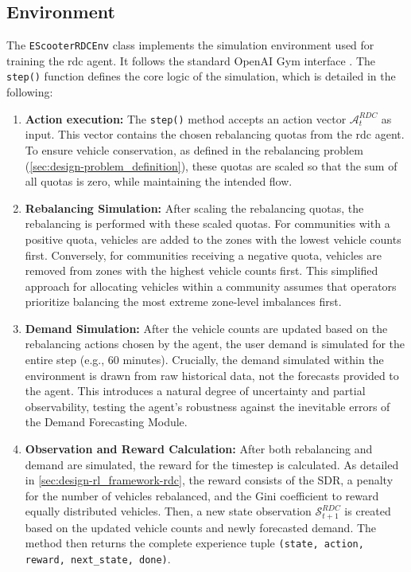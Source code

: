\subsection{Environment}
The \texttt{EScooterRDCEnv} class implements the simulation environment used for training the \gls{rdc} agent.
It follows the standard OpenAI Gym interface \cite{brockman_openai_2016}.
The \texttt{step()} function defines the core logic of the simulation, which is detailed in the following:

\begin{enumerate}
    \item \textbf{Action execution:}
        The \texttt{step()} method accepts an action vector $\mathcal{A}_t^{RDC}$ as input.
        This vector contains the chosen rebalancing quotas from the \gls{rdc} agent.
        To ensure vehicle conservation, as defined in the rebalancing problem (\autoref{sec:design-problem_definition}), these quotas are scaled so that the sum of all quotas is zero, while maintaining the intended flow.
    \item \textbf{Rebalancing Simulation:}
        After scaling the rebalancing quotas, the rebalancing is performed with these scaled quotas.
        For communities with a positive quota, vehicles are added to the zones with the lowest vehicle counts first.
        Conversely, for communities receiving a negative quota, vehicles are removed from zones with the highest vehicle counts first.
        This simplified approach for allocating vehicles within a community assumes that operators prioritize balancing the most extreme zone-level imbalances first.
    \item \textbf{Demand Simulation:}
        After the vehicle counts are updated based on the rebalancing actions chosen by the agent, the user demand is simulated for the entire step (e.g., 60 minutes).
        Crucially, the demand simulated within the environment is drawn from raw historical data, not the forecasts provided to the agent.
        This introduces a natural degree of uncertainty and partial observability, testing the agent's robustness against the inevitable errors of the Demand Forecasting Module.
    \item \textbf{Observation and Reward Calculation:}
        After both rebalancing and demand are simulated, the reward for the timestep is calculated.
        As detailed in \autoref{sec:design-rl_framework-rdc}, the reward consists of the SDR, a penalty for the number of vehicles rebalanced, and the Gini coefficient to reward equally distributed vehicles.
        Then, a new state observation $\mathcal{S}_{t+1}^{RDC}$ is created based on the updated vehicle counts and newly forecasted demand.
        The method then returns the complete experience tuple \texttt{(state, action, reward, next\_state, done)}.
\end{enumerate}


